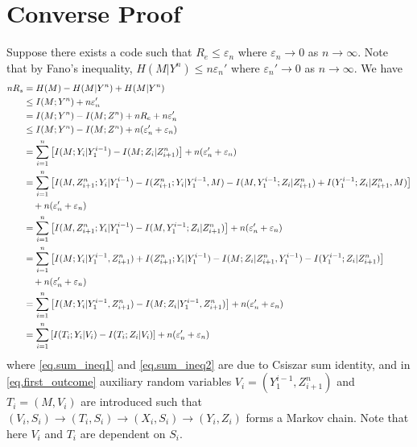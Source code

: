 \documentclass[12pt, Draft, onecolumn]{IEEEtran}
\def\ie{{\it i.e., }}
\begin{document}
\section{Converse Proof}

Suppose there exists a code such that $R_e\leq \varepsilon_n$ where $\varepsilon_n\rightarrow 0$ as $n\rightarrow \infty$. Note that by Fano's inequality, $H(M|Y^n)\leq n\varepsilon_n'$ where $\varepsilon_n'\rightarrow 0$ as $n\rightarrow \infty$. We have
\begin{align}
nR_s &= H(M)-H(M|Y^n) +H(M|Y^n)\notag\\
&\leq I(M;Y^n) + n\varepsilon_n'\notag\\
&= I(M;Y^n)-I(M;Z^n) +nR_e+n\varepsilon_n'\notag\\
&\leq  I(M;Y^n)-I(M;Z^n) +n(\varepsilon_n'+\varepsilon_n)\notag\\
&= \sum_{i=1}^n \left[I(M;Y_i|Y_1^{i-1})-I(M;Z_i|Z_{i+1}^n)\right]+n(\varepsilon_n'+\varepsilon_n)\notag\\
&= \sum_{i=1}^n \left[I(M,Z_{i+1}^n;Y_i|Y_1^{i-1})-I(Z_{i+1}^n;Y_i|Y_1^{i-1},M)-I(M,Y_1^{i-1};Z_i|Z_{i+1}^n)+I(Y_1^{i-1};Z_i|Z_{i+1}^n,M)\right]\notag\\
&\quad+n(\varepsilon_n'+\varepsilon_n)\notag\\
\label{eq.sum_ineq1}
&= \sum_{i=1}^n \left[I(M,Z_{i+1}^n;Y_i|Y_1^{i-1})-I(M,Y_1^{i-1};Z_i|Z_{i+1}^n)\right]+n(\varepsilon_n'+\varepsilon_n)\\
&= \sum_{i=1}^n \left[I(M;Y_i|Y_1^{i-1},Z_{i+1}^n)+I(Z_{i+1}^n;Y_i|Y_1^{i-1})-I(M;Z_i|Z_{i+1}^n,Y_1^{i-1})-I(Y_1^{i-1};Z_i|Z_{i+1}^n)\right]\notag\\
&\quad+n(\varepsilon_n'+\varepsilon_n)\notag\\
\label{eq.sum_ineq2}
&= \sum_{i=1}^n \left[I(M;Y_i|Y_1^{i-1},Z_{i+1}^n)-I(M;Z_i|Y_1^{i-1},Z_{i+1}^n)\right]+n(\varepsilon_n'+\varepsilon_n)\\
\label{eq.first_outcome}
&= \sum_{i=1}^n \left[I(T_i;Y_i|V_i)-I(T_i;Z_i|V_i)\right]+n(\varepsilon_n'+\varepsilon_n)
\end{align}
where \eqref{eq.sum_ineq1} and \eqref{eq.sum_ineq2} are due to Csiszar sum identity, and in \eqref{eq.first_outcome} auxiliary random variables $V_i = (Y_1^{i-1},Z_{i+1}^n)$ and $T_i = (M,V_i)$ are introduced such that $(V_i,S_i)\rightarrow (T_i,S_i)\rightarrow (X_i,S_i)  \rightarrow (Y_i,Z_i)$ forms a Markov chain. Note that here $V_i$ and $T_i$ are dependent on $S_i$.
\end{document}
